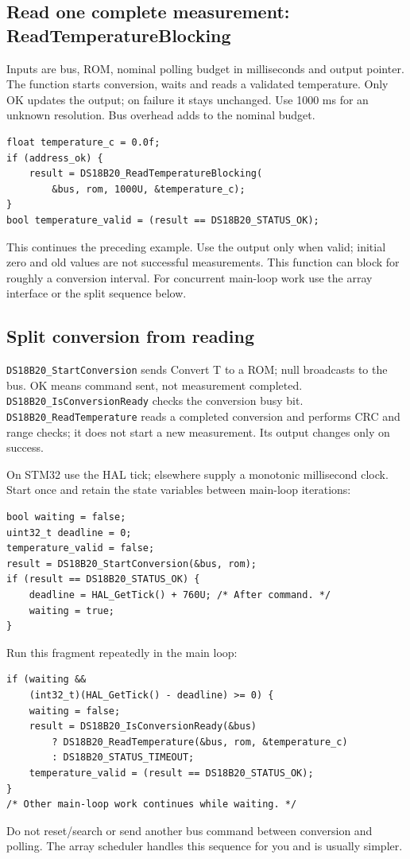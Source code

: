 \subsection{Read one complete measurement: ReadTemperatureBlocking}
Inputs are bus, ROM, nominal polling budget in milliseconds and output pointer.
The function starts conversion, waits and reads a validated temperature. Only
OK updates the output; on failure it stays unchanged. Use 1000 ms for an unknown
resolution. Bus overhead adds to the nominal budget.
\begin{lstlisting}
float temperature_c = 0.0f;
if (address_ok) {
    result = DS18B20_ReadTemperatureBlocking(
        &bus, rom, 1000U, &temperature_c);
}
bool temperature_valid = (result == DS18B20_STATUS_OK);
\end{lstlisting}
This continues the preceding example. Use the output only when valid; initial
zero and old values are not successful measurements. This function can block
for roughly a conversion interval. For concurrent main-loop work use the array
interface or the split sequence below.

\subsection{Split conversion from reading}
\texttt{DS18B20\_StartConversion} sends Convert T to a ROM; null broadcasts to the
bus. OK means command sent, not measurement completed.
\texttt{DS18B20\_IsConversionReady} checks the conversion busy bit.
\texttt{DS18B20\_ReadTemperature} reads a completed conversion and performs CRC
and range checks; it does not start a new measurement. Its output changes only
on success.

On STM32 use the HAL tick; elsewhere supply a monotonic millisecond clock.
Start once and retain the state variables between main-loop iterations:
\begin{lstlisting}
bool waiting = false;
uint32_t deadline = 0;
temperature_valid = false;
result = DS18B20_StartConversion(&bus, rom);
if (result == DS18B20_STATUS_OK) {
    deadline = HAL_GetTick() + 760U; /* After command. */
    waiting = true;
}
\end{lstlisting}
Run this fragment repeatedly in the main loop:
\begin{lstlisting}
if (waiting &&
    (int32_t)(HAL_GetTick() - deadline) >= 0) {
    waiting = false;
    result = DS18B20_IsConversionReady(&bus)
        ? DS18B20_ReadTemperature(&bus, rom, &temperature_c)
        : DS18B20_STATUS_TIMEOUT;
    temperature_valid = (result == DS18B20_STATUS_OK);
}
/* Other main-loop work continues while waiting. */
\end{lstlisting}
Do not reset/search or send another bus command between conversion and polling.
The array scheduler handles this sequence for you and is usually simpler.

